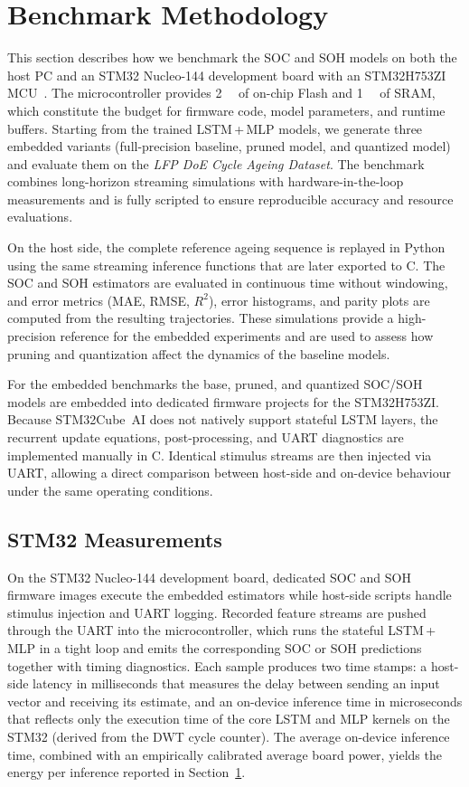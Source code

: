 \documentclass[review]{elsarticle}
\begin{document}
\section{Benchmark Methodology}\label{sec:kpis}
This section describes how we benchmark the SOC and SOH models on both the host PC and an STM32 Nucleo-144 development board with an STM32H753ZI MCU~\cite{STM32Nucleo144Boards2025_Datasheet,naguibMicroprocessorExecutionTime2022}. The microcontroller provides \SI{2}{\mega\byte} of on-chip Flash and \SI{1}{\mega\byte} of SRAM, which constitute the budget for firmware code, model parameters, and runtime buffers. Starting from the trained LSTM\,+\,MLP models, we generate three embedded variants (full-precision baseline, pruned model, and quantized model) and evaluate them on the \emph{LFP DoE Cycle Ageing Dataset}. The benchmark combines long-horizon streaming simulations with hardware-in-the-loop measurements and is fully scripted to ensure reproducible accuracy and resource evaluations.

On the host side, the complete reference ageing sequence is replayed in Python using the same streaming inference functions that are later exported to C. The SOC and SOH estimators are evaluated in continuous time without windowing, and error metrics (MAE, RMSE, $R^2$), error histograms, and parity plots are computed from the resulting trajectories. These simulations provide a high-precision reference for the embedded experiments and are used to assess how pruning and quantization affect the dynamics of the baseline models.

For the embedded benchmarks the base, pruned, and quantized SOC/SOH models are embedded into dedicated firmware projects for the STM32H753ZI. Because STM32Cube~AI does not natively support stateful LSTM layers, the recurrent update equations, post-processing, and UART diagnostics are implemented manually in C. Identical stimulus streams are then injected via UART, allowing a direct comparison between host-side and on-device behaviour under the same operating conditions.

\subsection{STM32 Measurements}
On the STM32 Nucleo-144 development board, dedicated SOC and SOH firmware images execute the embedded estimators while host-side scripts handle stimulus injection and UART logging. Recorded feature streams are pushed through the UART into the microcontroller, which runs the stateful LSTM\,+\,MLP in a tight loop and emits the corresponding SOC or SOH predictions together with timing diagnostics. Each sample produces two time stamps: a host-side latency in milliseconds that measures the delay between sending an input vector and receiving its estimate, and an on-device inference time in microseconds that reflects only the execution time of the core LSTM and MLP kernels on the STM32 (derived from the DWT cycle counter). The average on-device inference time, combined with an empirically calibrated average board power, yields the energy per inference reported in Section~\ref{sec:kpis}.
\end{document}
